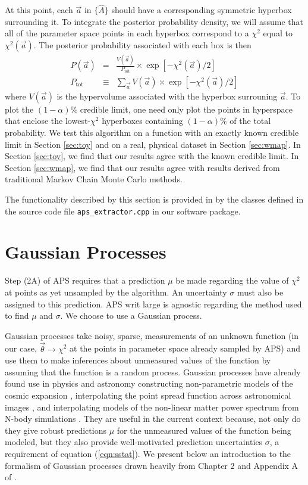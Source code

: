 \documentclass[useAMS,usenatbib]{aastex}
\newcommand{\APS}{APS }
\begin{document}
At this point, each $\vec{a}$ in $\{\hat{A}\}$ should have a corresponding symmetric hyperbox
surrounding it.  To integrate the posterior probability density, we will assume that all of the
parameter space points in each hyperbox correspond to a $\chi^2$ equal to $\chi^2(\vec{a})$.
The posterior probability associated with each box is then
\begin{eqnarray}
P(\vec{a})&=&\frac{V(\vec{a})}{P_\text{tot}}\times\exp\left[-\chi^2(\vec{a})/2\right]
\label{eqn:posterior}\\
P_\text{tot}&\equiv&\sum_{\vec{a}} V(\vec{a})\times\exp\left[-\chi^2(\vec{a})/2\right]
\end{eqnarray}
where $V(\vec{a})$ is the hypervolume associated with the hyperbox surrouning $\vec{a}$.
To plot the $(1-\alpha)\%$ credible limit, one need only plot the points in hyperspace that
enclose the lowest-$\chi^2$ hyperboxes containing $(1-\alpha)\%$ of the total probability.
We test this algorithm on a function with an exactly known credible limit
in Section \ref{sec:toy} and on a real, physical dataset in Section \ref{sec:wmap}.  In 
Section \ref{sec:toy}, we find that our results agree with the known credible limit.
In Section \ref{sec:wmap}, we find that our results agree with results derived from traditional
Markov Chain Monte Carlo methods.

The functionality described by this section is provided in by the classes defined in the source
code file \verb|aps_extractor.cpp| in our software package.

\section{Gaussian Processes}
\label{sec:gp}

Step (2A) of \APS requires that a prediction $\mu$ be made regarding the value
of $\chi^2$ at points as yet unsampled by the algorithm.  An uncertainty $\sigma$
must also be assigned to this prediction.  APS writ large is agnostic regarding
the method used to find $\mu$ and $\sigma$.  We choose to use a Gaussian process.

Gaussian processes take noisy, sparse, measurements of an unknown function (in our
case, $\vec{\theta}\rightarrow\chi^2$ at
the points in parameter space already sampled by APS) and use them to
make inferences about unmeasured values of the function by assuming that the
function is a random process.  Gaussian processes have already found use in physics
and astronomy constructing non-parametric models of the cosmic expansion
\cite{ericgp}, interpolating the point spread function across 
astronomical images
\cite{psf}, and interpolating models of the non-linear matter
power spectrum from N-body simulations \cite{habib}.
They are useful in the current context because, not only do they
give robust predictions $\mu$ for the unmeasured values of the
function being modeled, but they also
provide well-motivated prediction uncertainties $\sigma$, a requirement of
equation (\ref{eqn:sstat}).  We present below an introduction to the
formalism of Gaussian processes drawn heavily
from Chapter 2 and Appendix A 
of \cite{gp}.
\end{document}
